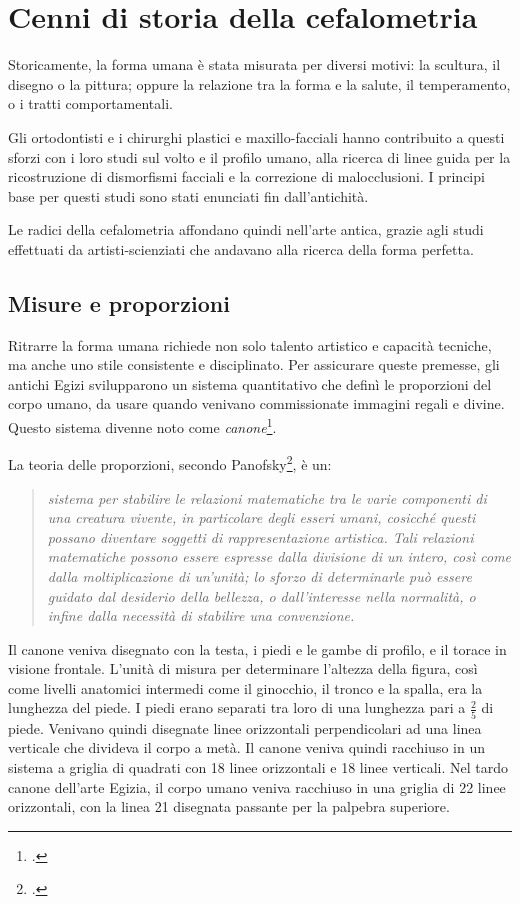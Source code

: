 \chapter{Cenni di storia della cefalometria}
Storicamente, la forma umana è stata misurata per diversi motivi: la scultura, il disegno o la pittura; oppure la relazione tra la forma e la salute, il temperamento, o i tratti comportamentali.

Gli ortodontisti e i chirurghi plastici e maxillo-facciali hanno contribuito a questi sforzi con i loro studi sul volto e il profilo umano, alla ricerca di linee guida per la ricostruzione di dismorfismi facciali e la correzione di malocclusioni. I principi base per questi studi sono stati enunciati fin dall'antichità.

Le radici della cefalometria affondano quindi nell'arte antica, grazie agli studi effettuati da artisti-scienziati che andavano alla ricerca della forma perfetta.

\section{Misure e proporzioni}
Ritrarre la forma umana richiede non solo talento artistico e capacità tecniche, ma anche uno stile consistente e disciplinato. Per assicurare queste premesse, gli antichi Egizi svilupparono un sistema quantitativo che definì le proporzioni del corpo umano, da usare quando venivano commissionate immagini regali e divine. Questo sistema divenne noto come \textit{canone}\footcite{Schaefer1963,Mueller1973,Iversen1975}.

La teoria delle proporzioni, secondo Panofsky\footcite{Panofsky1974}, è un:
\begin{quotation}
\textit{sistema per stabilire le relazioni matematiche tra le varie componenti di una creatura vivente, in particolare degli esseri umani, cosicché questi possano diventare soggetti di rappresentazione artistica. Tali relazioni matematiche possono essere espresse dalla divisione di un intero, così come dalla moltiplicazione di un'unità; lo sforzo di determinarle può essere guidato dal desiderio della bellezza, o dall'interesse nella normalità, o infine dalla necessità di stabilire una convenzione.}
\end{quotation}

Il canone veniva disegnato con la testa, i piedi e le gambe di profilo, e il torace in visione frontale. L'unità di misura per determinare l'altezza della figura, così come livelli anatomici intermedi come il ginocchio, il tronco e la spalla, era la lunghezza del piede. I piedi erano separati tra loro di una lunghezza pari a $\frac{2}{5}$ di piede. Venivano quindi disegnate linee orizzontali perpendicolari ad una linea verticale che divideva il corpo a metà. Il canone veniva quindi racchiuso in un sistema a griglia di quadrati con 18 linee orizzontali e 18 linee verticali. Nel tardo canone dell'arte Egizia, il corpo umano veniva racchiuso in una griglia di 22 linee orizzontali, con la linea 21 disegnata passante per la palpebra superiore.

